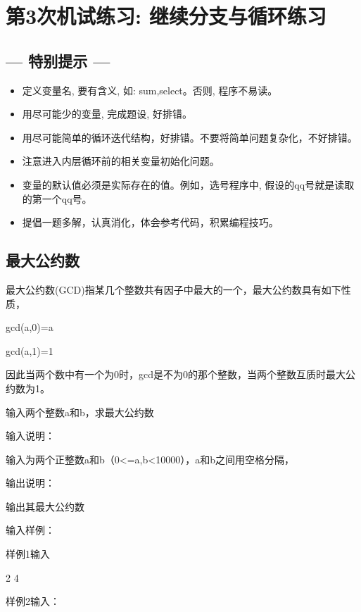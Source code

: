 %
%
%
\chapter{第3次机试练习: 继续分支与循环练习}

\section*{--- 特别提示 ---}

\begin{itemize}
	\item 定义变量名, 要有含义, 如: sum,select。否则, 程序不易读。
	\item 用尽可能少的变量, 完成题设, 好排错。
	\item 用尽可能简单的循环迭代结构，好排错。不要将简单问题复杂化，不好排错。
	\item 注意进入内层循环前的相关变量初始化问题。
	\item 变量的默认值必须是实际存在的值。例如，选号程序中, 假设的qq号就是读取的第一个qq号。
	\item 提倡一题多解，认真消化，体会参考代码，积累编程技巧。
\end{itemize}


\section{最大公约数}	
最大公约数(GCD)指某几个整数共有因子中最大的一个，最大公约数具有如下性质，

gcd(a,0)=a

gcd(a,1)=1

因此当两个数中有一个为0时，gcd是不为0的那个整数，当两个整数互质时最大公约数为1。

输入两个整数a和b，求最大公约数

输入说明：

输入为两个正整数a和b（0<=a,b<10000），a和b之间用空格分隔，

输出说明：

输出其最大公约数

输入样例：

样例1输入

2 4

样例2输入：


